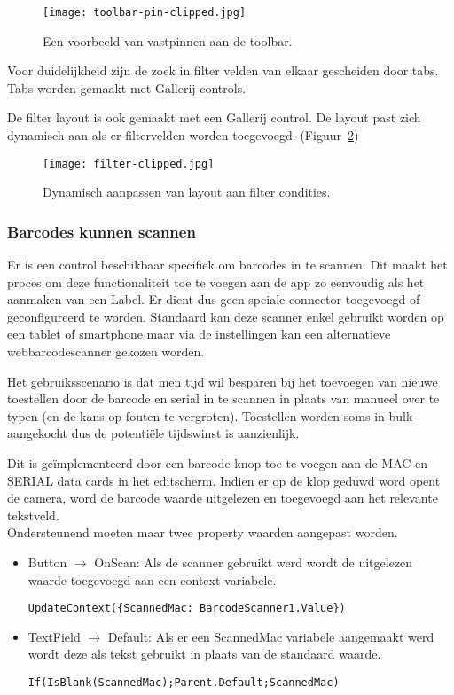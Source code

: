 \begin{figure}[h!]
    \texttt{[image: toolbar-pin-clipped.jpg]}
    \caption{Een voorbeeld van vastpinnen aan de toolbar.}
    \label{fig:toolbar-pin-clipped}
\end{figure}

Voor duidelijkheid zijn de zoek in filter velden van elkaar gescheiden door tabs. Tabs worden gemaakt met Gallerij controls.

De filter layout is ook gemaakt met een Gallerij control. De layout past zich dynamisch aan als er filtervelden worden toegevoegd. (Figuur~\ref{fig:filter-clipped})

\begin{figure}[h!]
    \texttt{[image: filter-clipped.jpg]}
    \caption{Dynamisch aanpassen van layout aan filter condities.}
    \label{fig:filter-clipped}
\end{figure}

\subsubsection{Barcodes kunnen scannen}

Er is een control beschikbaar specifiek om barcodes in te scannen. Dit maakt het proces om deze functionaliteit toe te voegen aan de app zo eenvoudig als het aanmaken van een Label. Er dient dus geen speiale connector toegevoegd of geconfigureerd te worden. Standaard kan deze scanner enkel gebruikt worden op een tablet of smartphone maar via de instellingen kan een alternatieve webbarcodescanner gekozen worden.

Het gebruiksscenario is dat men tijd wil besparen bij het toevoegen van nieuwe toestellen door de barcode en serial in te scannen in plaats van manueel over te typen (en de kans op fouten te vergroten). Toestellen worden soms in bulk aangekocht dus de potentiële tijdswinst is aanzienlijk.

Dit is geïmplementeerd door een barcode knop toe te voegen aan de MAC en SERIAL data cards in het editscherm. Indien er op de klop geduwd word opent de camera, word de barcode waarde uitgelezen en toegevoegd aan het relevante tekstveld.\\
Ondersteunend moeten maar twee property waarden aangepast worden.
\begin{itemize}
    \item Button $\rightarrow$ OnScan: Als de scanner gebruikt werd wordt de uitgelezen waarde toegevoegd aan een context variabele.
\begin{lstlisting}
UpdateContext({ScannedMac: BarcodeScanner1.Value})
\end{lstlisting}
    \item TextField $\rightarrow$ Default: Als er een ScannedMac variabele aangemaakt werd wordt deze als tekst gebruikt in plaats van de standaard waarde.
\begin{lstlisting}
If(IsBlank(ScannedMac);Parent.Default;ScannedMac)
\end{lstlisting}    
\end{itemize}

